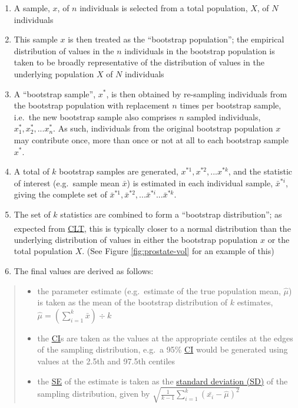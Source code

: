 \documentclass[
]{article}
\providecommand{\tightlist}{%
  \setlength{\itemsep}{0pt}\setlength{\parskip}{0pt}}
\begin{document}
\begin{enumerate}
\def\labelenumi{\arabic{enumi}.}
\tightlist
\item
  A sample, \(x\), of \(n\) individuals is selected from a total population, \(X\), of \(N\) individuals
\item
  This sample \(x\) is then treated as the ``bootstrap population''; the empirical distribution of values in the \(n\) individuals in the bootstrap population is taken to be broadly representative of the distribution of values in the underlying population \(X\) of \(N\) individuals
\item
  A ``bootstrap sample'', \(x^*\), is then obtained by re-sampling individuals from the bootstrap population with replacement \(n\) times per bootstrap sample, i.e.~the new bootstrap sample also comprises \(n\) sampled individuals, \(x^*_1, x^*_2,...x^*_n\). As such, individuals from the original bootstrap population \(x\) may contribute once, more than once or not at all to each bootstrap sample \(x^*\).
\item
  A total of \(k\) bootstrap samples are generated, \(x^{*1}, x^{*2},...x^{*k}\), and the statistic of interest (e.g.~sample mean \(\bar{x}\)) is estimated in each individual sample, \(\bar{x}^{*i}\), giving the complete set of \(\bar{x}^{*1}, \bar{x}^{*2},...\bar{x}^{*i}...\bar{x}^{*k}\).
\item
  The set of \(k\) statistics are combined to form a ``bootstrap distribution''; as expected from \hyperref[acronyms_CLT]{CLT}\textsuperscript{}, this is typically closer to a normal distribution than the underlying distribution of values in either the bootstrap population \(x\) or the total population \(X\). (See Figure \ref{fig:prostate-vol} for an example of this)
\item
  The final values are derived as follows:
\end{enumerate}

\begin{quote}
\begin{itemize}
\tightlist
\item
  the parameter estimate (e.g.~estimate of the true population mean, \(\hat{\mu}\)) is taken as the mean of the bootstrap distribution of \(k\) estimates, \(\hat{\mu} = (\sum^k_{i = 1} \bar{x}) \div k\)
\item
  the \hyperref[acronyms_CI]{CI}s are taken as the values at the appropriate centiles at the edges of the sampling distribution, e.g.~a 95\% \hyperref[acronyms_CI]{CI} would be generated using values at the 2.5th and 97.5th centiles
\item
  the \hyperref[acronyms_SE]{SE} of the estimate is taken as the \hyperref[acronyms_SD]{standard deviation (SD)} of the sampling distribution, given by \(\sqrt{\frac{1}{k - 1} \sum^k_{i = 1} (\bar{x_i} - \hat{\mu})^2}\)
\end{itemize}
\end{quote}
\end{document}
